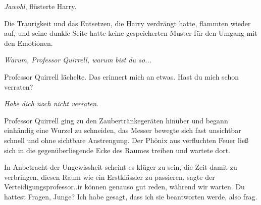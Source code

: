 \glqq{}\emph{Jawohl}\grqq{}, flüsterte Harry.

Die Traurigkeit und das Entsetzen, die Harry verdrängt hatte, flammten wieder
auf, und seine dunkle Seite hatte keine gespeicherten Muster für den Umgang mit
den Emotionen.

\emph{Warum, Professor Quirrell, warum bist du so...}

Professor Quirrell lächelte. \glqq{}Das erinnert mich an etwas. Hast du mich
schon verraten?\grqq{}

\glqq{}\emph{Habe dich noch nicht verraten.}\grqq{}

Professor Quirrell ging zu den Zaubertränkegeräten hinüber und begann einhändig
eine Wurzel zu schneiden, das Messer bewegte sich fast unsichtbar schnell und
ohne sichtbare Anstrengung. Der Phönix aus verfluchten Feuer ließ sich in die
gegenüberliegende Ecke des Raumes treiben und wartete dort.

\glqq{}In Anbetracht der Ungewissheit scheint es klüger zu sein, die Zeit damit
zu verbringen, diesen Raum wie ein Erstklässler zu passieren\grqq{}, sagte der
Verteidigungsprofessor.\grqq{}.ir können genauso gut reden, während wir warten.
Du hattest Fragen, Junge? Ich habe gesagt, dass ich sie beantworten werde, also
frag.\grqq{}

